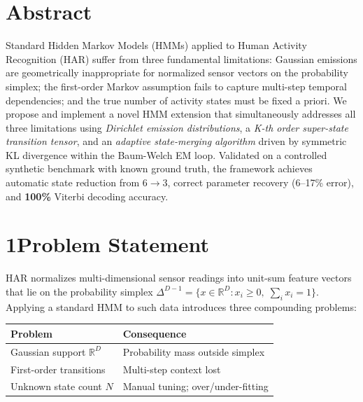 \documentclass[10pt,a4paper,twocolumn]{article}
\begin{document}

\section*{\large Abstract}

Standard Hidden Markov Models (HMMs) applied to Human Activity Recognition (HAR)
suffer from three fundamental limitations: Gaussian emissions are geometrically
inappropriate for normalized sensor vectors on the probability simplex; the
first-order Markov assumption fails to capture multi-step temporal dependencies;
and the true number of activity states must be fixed a priori.
We propose and implement a novel HMM extension that simultaneously addresses all
three limitations using \emph{Dirichlet emission distributions}, a \emph{K-th
order super-state transition tensor}, and an \emph{adaptive state-merging
algorithm} driven by symmetric KL divergence within the Baum-Welch EM loop.
Validated on a controlled synthetic benchmark with known ground truth, the
framework achieves automatic state reduction from $6 \to 3$, correct parameter
recovery (6--17\% error), and \textbf{100\%} Viterbi decoding accuracy.

\section*{1\quad Problem Statement}

HAR normalizes multi-dimensional sensor readings into unit-sum feature vectors
that lie on the probability simplex
$\Delta^{D-1} = \bigl\{x \in \mathbb{R}^D : x_i \geq 0,\; \sum_i x_i = 1\bigr\}$.
Applying a standard HMM to such data introduces three compounding problems:

\smallskip
\begin{center}
\footnotesize
\renewcommand{\arraystretch}{1.1}
\begin{tabular}{@{}ll@{}}
\toprule
\textbf{Problem} & \textbf{Consequence} \\
\midrule
Gaussian support $\mathbb{R}^D$ & Probability mass outside simplex \\
First-order transitions & Multi-step context lost \\
Unknown state count $N$ & Manual tuning; over/under-fitting \\
\bottomrule
\end{tabular}
\end{center}
\end{document}
